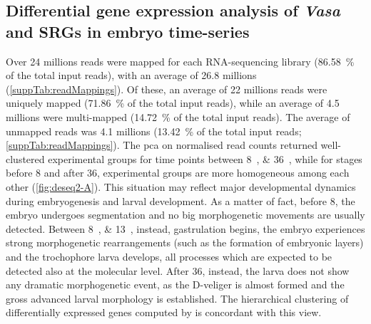 \subsection{Differential gene expression analysis of \textit{Vasa} and SRGs in embryo time-series} \label{chapter:insitu-DGE}
Over 24 millions reads were mapped for each RNA-sequencing library (\qty{86.58}{\percent} of the total input reads), with an average of 26.8 millions (\cref{suppTab:readMappings}). Of these, an average of 22 millions reads were uniquely mapped (\qty{71.86}{\percent} of the total input reads), while an average of 4.5 millions were multi-mapped (\qty{14.72}{\percent} of the total input reads). The average of unmapped reads was 4.1 millions (\qty{13.42}{\percent} of the total input reads; \cref{suppTab:readMappings}). The \gls{pca} on normalised read counts returned well-clustered experimental groups for time points between \qtylist{8;36}{\hpf}, while for stages before \qty{8}{\hpf} and after \qty{36}{\hpf}, experimental groups are more homogeneous among each other (\cref{fig:deseq2-A}). This situation may reflect major developmental dynamics during embryogenesis and larval development. As a matter of fact, before \qty{8}{\hpf}, the embryo undergoes segmentation and no big morphogenetic movements are usually detected. Between \qtylist{8;13}{\hpf}, instead, gastrulation begins, the embryo experiences strong morphogenetic rearrangements (such as the formation of embryonic layers) and the trochophore larva develops, all processes which are expected to be detected also at the molecular level. After \qty{36}{\hpf}, instead, the larva does not show any dramatic morphogenetic event, as the D-veliger is almost formed and the gross advanced larval morphology is established. The hierarchical clustering of differentially expressed genes computed by  is concordant with this view.

